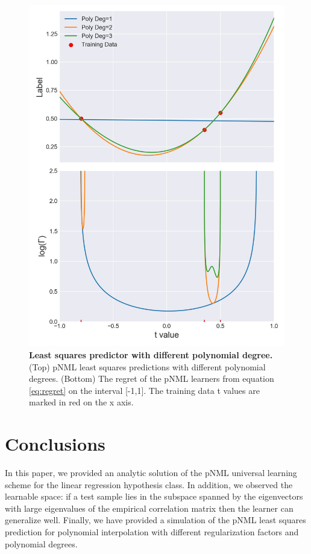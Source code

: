 \documentclass[conference,letterpaper]{IEEEtran}
\begin{document}
\begin{figure}[h]
    \centering
    \includegraphics[width=\linewidth]{figures/least_sqaures_with_poly_degree.jpg}
    \caption{\textbf{Least squares predictor with different polynomial degree.} (Top) pNML least squares predictions with different polynomial degrees. (Bottom) The regret of the pNML learners from equation \ref{eq:regret} on the interval [-1,1]. The training data t values are marked in red on the x axis.}
    \label{fig:least_squares_with_poly}
\end{figure}


\section{Conclusions} \label{sec:conclusion}

In this paper, we provided an analytic solution of the pNML universal learning scheme for the linear regression hypothesis class. 
In addition, we observed the learnable space: if a test sample lies in the subspace spanned by the eigenvectors with large eigenvalues of the empirical correlation matrix then the learner can generalize well. 
Finally, we have provided a simulation of the pNML least squares prediction for polynomial interpolation with different regularization factors and polynomial degrees. 
\end{document}
